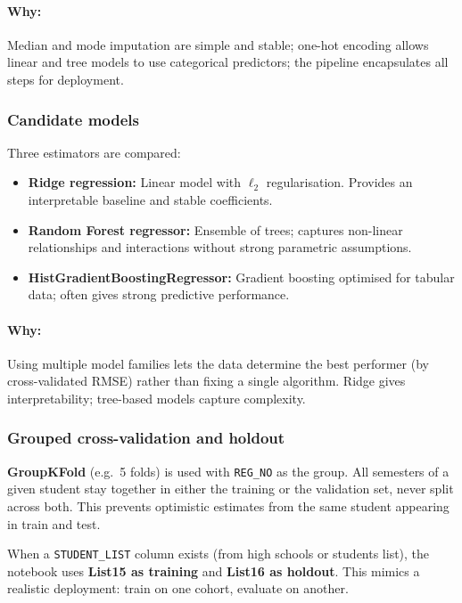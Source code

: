 \documentclass[12pt,a4paper]{article}
\begin{document}
\paragraph{Why:} Median and mode imputation are simple and stable; one-hot encoding allows linear and tree models to use categorical predictors; the pipeline encapsulates all steps for deployment.

\subsubsection{Candidate models}

Three estimators are compared:

\begin{itemize}[leftmargin=*]
  \item \textbf{Ridge regression:} Linear model with $\ell_2$ regularisation. Provides an interpretable baseline and stable coefficients.
  \item \textbf{Random Forest regressor:} Ensemble of trees; captures non-linear relationships and interactions without strong parametric assumptions.
  \item \textbf{HistGradientBoostingRegressor:} Gradient boosting optimised for tabular data; often gives strong predictive performance.
\end{itemize}

\paragraph{Why:} Using multiple model families lets the data determine the best performer (by cross-validated RMSE) rather than fixing a single algorithm. Ridge gives interpretability; tree-based models capture complexity.

\subsubsection{Grouped cross-validation and holdout}

\textbf{GroupKFold} (e.g.\ 5 folds) is used with \texttt{REG\_NO} as the group. All semesters of a given student stay together in either the training or the validation set, never split across both. This prevents optimistic estimates from the same student appearing in train and test.

When a \texttt{STUDENT\_LIST} column exists (from high schools or students list), the notebook uses \textbf{List15 as training} and \textbf{List16 as holdout}. This mimics a realistic deployment: train on one cohort, evaluate on another.
\end{document}
